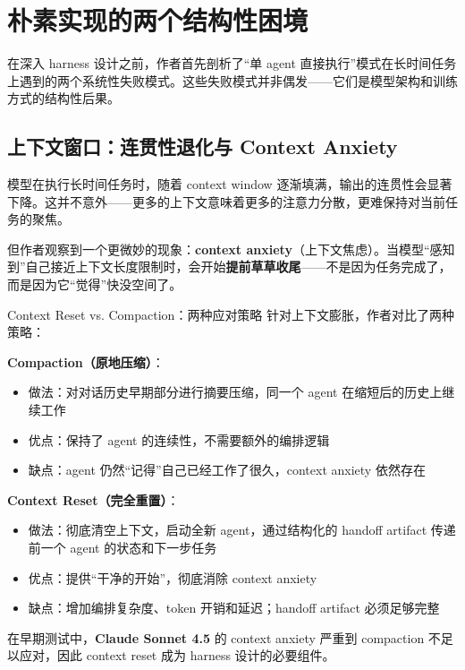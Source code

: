 \section{朴素实现的两个结构性困境}

在深入 harness 设计之前，作者首先剖析了``单 agent 直接执行''模式在长时间任务上遇到的两个系统性失败模式。这些失败模式并非偶发——它们是模型架构和训练方式的结构性后果。

\subsection{上下文窗口：连贯性退化与 Context Anxiety}

模型在执行长时间任务时，随着 context window 逐渐填满，输出的连贯性会显著下降。这并不意外——更多的上下文意味着更多的注意力分散，更难保持对当前任务的聚焦。

但作者观察到一个更微妙的现象：\textbf{context anxiety}（上下文焦虑）。当模型``感知到''自己接近上下文长度限制时，会开始\textbf{提前草草收尾}——不是因为任务完成了，而是因为它``觉得''快没空间了。

\begin{knowledgebox}{Context Reset vs. Compaction：两种应对策略}
针对上下文膨胀，作者对比了两种策略：

\textbf{Compaction（原地压缩）}：
\begin{itemize}[leftmargin=1.5em]
    \item 做法：对对话历史早期部分进行摘要压缩，同一个 agent 在缩短后的历史上继续工作
    \item 优点：保持了 agent 的连续性，不需要额外的编排逻辑
    \item 缺点：agent 仍然``记得''自己已经工作了很久，context anxiety 依然存在
\end{itemize}

\textbf{Context Reset（完全重置）}：
\begin{itemize}[leftmargin=1.5em]
    \item 做法：彻底清空上下文，启动全新 agent，通过结构化的 handoff artifact 传递前一个 agent 的状态和下一步任务
    \item 优点：提供``干净的开始''，彻底消除 context anxiety
    \item 缺点：增加编排复杂度、token 开销和延迟；handoff artifact 必须足够完整
\end{itemize}

在早期测试中，\textbf{Claude Sonnet 4.5} 的 context anxiety 严重到 compaction 不足以应对，因此 context reset 成为 harness 设计的必要组件。
\end{knowledgebox}

